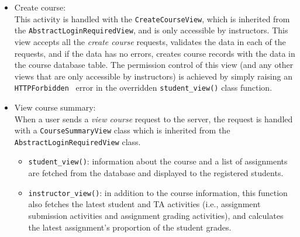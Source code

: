 \begin{itemize}
    \label{item:NEW_COURSE}
    \item Create course: \\
        This activity is handled with the \texttt{CreateCourseView}, which is
        inherited from the \texttt{AbstractLoginRequiredView}, and is
        only accessible by instructors. 
        This view accepts all the \emph{create course} requests, validates the
        data in each of the requests, and if the data has no errors,
        creates course records with the data in the course database table.
        The permission control of this view
        (and any other views that are only accessible by instructors) is
        achieved by simply raising an \texttt{HTTPForbidden}~\citep[Section 6.5.3]{http}
        error in the overridden \texttt{student\_view()} class function.
    
    \item View course summary:\\
    When a user sends a \emph{view course} request to the server, the request
    is handled with a \texttt{CourseSummaryView} class which is inherited from
    the \texttt{AbstractLogin\-Required\-View} class.
    \begin{itemize}
        \item \texttt{student\_view()}: 
            information about the course and a list of assignments
            are fetched from the database and displayed to the registered
            students.
        \item \texttt{instructor\_view()}:
            in addition to the course information,
            this function also fetches the latest student and TA activities 
            (i.e., assignment submission activities and  assignment grading
            activities),
            and calculates the latest assignment's proportion of the student
            grades.
    \end{itemize}
\end{itemize}

